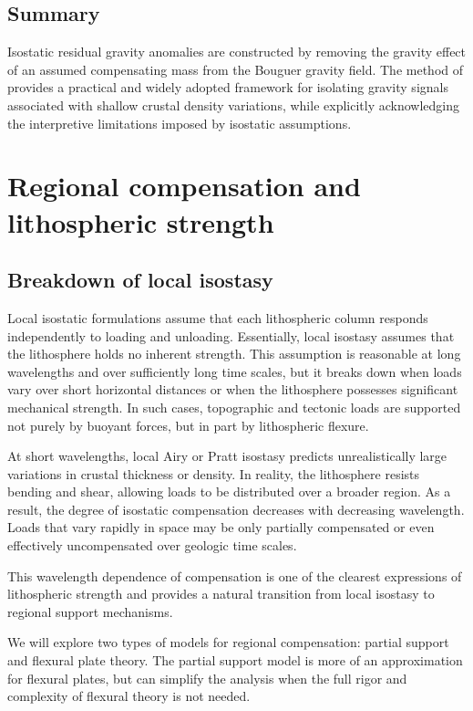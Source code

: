 \subsection*{Summary}

Isostatic residual gravity anomalies are constructed by removing the gravity effect of an assumed compensating mass from the Bouguer gravity field. The method of \citet{Simpson_etal1986} provides a practical and widely adopted framework for isolating gravity signals associated with shallow crustal density variations, while explicitly acknowledging the interpretive limitations imposed by isostatic assumptions.

\section{Regional compensation and lithospheric strength}\label{sec:regional_compensation}

\subsection{Breakdown of local isostasy}
Local isostatic formulations assume that each lithospheric column responds independently to loading and unloading. Essentially, local isostasy assumes that the lithosphere holds no inherent strength. This assumption is reasonable at long wavelengths and over sufficiently long time scales, but it breaks down when loads vary over short horizontal distances or when the lithosphere possesses significant mechanical strength. In such cases, topographic and tectonic loads are supported not purely by buoyant forces, but in part by lithospheric flexure.

At short wavelengths, local Airy or Pratt isostasy predicts unrealistically large variations in crustal thickness or density. In reality, the lithosphere resists bending and shear, allowing loads to be distributed over a broader region. As a result, the degree of isostatic compensation decreases with decreasing wavelength. Loads that vary rapidly in space may be only partially compensated or even effectively uncompensated over geologic time scales.

This wavelength dependence of compensation is one of the clearest expressions of lithospheric strength and provides a natural transition from local isostasy to regional support mechanisms.

We will explore two types of models for regional compensation: partial support and flexural plate theory.  The partial support model is more of an approximation for flexural plates, but can simplify the analysis when the full rigor and complexity of flexural theory is not needed.

